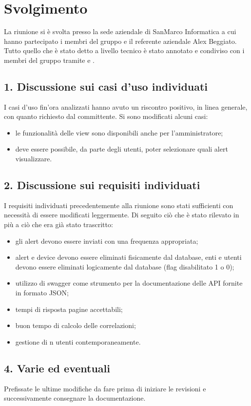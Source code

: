 \newpage
\section*{Svolgimento}

	La riunione si è svolta presso la sede aziendale di SanMarco Informatica a cui hanno partecipato i membri del gruppo e il referente aziendale Alex Beggiato. Tutto quello che è stato detto a livello tecnico è stato annotato e condiviso con i membri del gruppo tramite  e .

	\subsection*{1. Discussione sui casi d'uso individuati}

	I casi d'uso fin'ora analizzati hanno avuto un riscontro positivo, in linea generale, con quanto richiesto dal committente. Si sono modificati alcuni casi:
	\begin{itemize}
		\item le funzionalità delle view sono disponibili anche per l'amministratore;
		\item deve essere possibile, da parte degli utenti, poter selezionare quali alert visualizzare.
	\end{itemize}

	\subsection*{2. Discussione sui requisiti individuati}

	I requisiti individuati precedentemente alla riunione sono stati sufficienti con necessità di essere modificati leggermente. Di seguito ciò che è stato rilevato in più a ciò che era già stato trascritto:
	\begin{itemize}
		\item gli alert devono essere inviati con una frequenza appropriata;
		\item alert e device devono essere eliminati fisicamente dal database, enti e utenti devono essere eliminati logicamente dal database (flag disabilitato 1 o 0);
		\item utilizzo di swagger come strumento per la documentazione delle API fornite in formato JSON;
		\item tempi di risposta pagine accettabili;
		\item buon tempo di calcolo delle correlazioni;
		\item gestione di n utenti contemporaneamente.
	\end{itemize}
	
	\subsection*{4. Varie ed eventuali}
	
	Prefissate le ultime modifiche da fare prima di iniziare le revisioni e successivamente consegnare la documentazione.

	